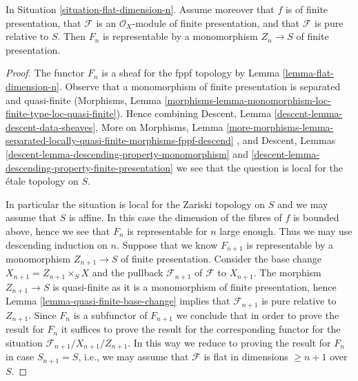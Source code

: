 \begin{theorem}
\label{theorem-flat-dimension-n-representable}
In Situation \ref{situation-flat-dimension-n}.
Assume moreover that $f$ is of finite presentation, that
$\mathcal{F}$ is an $\mathcal{O}_X$-module of finite presentation,
and that $\mathcal{F}$ is pure relative to $S$.
Then $F_n$ is representable by a monomorphism
$Z_n \to S$ of finite presentation.
\end{theorem}

\begin{proof}
The functor $F_n$ is a sheaf for the fppf topology by
Lemma \ref{lemma-flat-dimension-n}.
Observe that a monomorphism of finite presentation is
separated and quasi-finite (Morphisms, Lemma
\ref{morphisms-lemma-monomorphism-loc-finite-type-loc-quasi-finite}).
Hence combining
Descent, Lemma \ref{descent-lemma-descent-data-sheaves},
More on Morphisms, Lemma
\ref{more-morphisms-lemma-separated-locally-quasi-finite-morphisms-fppf-descend}
, and
Descent, Lemmas \ref{descent-lemma-descending-property-monomorphism} and
\ref{descent-lemma-descending-property-finite-presentation}
we see that the question is local for the \'etale topology on $S$.

\medskip\noindent
In particular the situation is local for the Zariski topology on $S$
and we may assume that $S$ is affine. In this case the dimension of the
fibres of $f$ is bounded above, hence we see that $F_n$ is representable
for $n$ large enough. Thus we may use descending induction on $n$.
Suppose that we know $F_{n + 1}$ is representable by a monomorphism
$Z_{n + 1} \to S$ of finite presentation. Consider the base change
$X_{n + 1} = Z_{n + 1} \times_S X$ and the pullback $\mathcal{F}_{n + 1}$
of $\mathcal{F}$ to $X_{n + 1}$. The morphism $Z_{n + 1} \to S$ is
quasi-finite as it is a monomorphism of finite presentation, hence
Lemma \ref{lemma-quasi-finite-base-change}
implies that $\mathcal{F}_{n + 1}$ is pure relative to $Z_{n + 1}$.
Since $F_n$ is a subfunctor of $F_{n + 1}$ we conclude that in order
to prove the result for $F_n$ it suffices to prove the result for the
corresponding functor for the situation
$\mathcal{F}_{n + 1}/X_{n + 1}/Z_{n + 1}$.
In this way we reduce to proving the result for $F_n$ in case
$S_{n + 1} = S$, i.e., we may assume that $\mathcal{F}$ is flat
in dimensions $\geq n + 1$ over $S$.


\end{proof}
